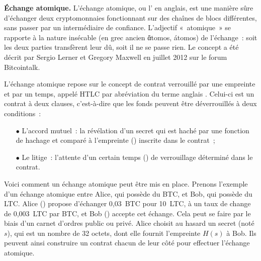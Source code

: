 
\textbf{Échange atomique.} L'échange atomique, ou l' en anglais, est une manière sûre d'échanger deux cryptomonnaies fonctionnant sur des chaînes de blocs différentes, sans passer par un intermédiaire de confiance. L'adjectif «~atomique~» se rapporte à la nature insécable (en grec ancien \foreignlanguage{greek}{ἄtomos}, átomos) de l'échange~: soit les deux parties transfèrent leur dû, soit il ne se passe rien. Le concept a été décrit par Sergio Lerner et Gregory Maxwell en juillet 2012 sur le forum Bitcointalk.

L'échange atomique repose sur le concept de contrat verrouillé par une empreinte et par un temps, appelé HTLC par abréviation du terme anglais . Celui-ci est un contrat à deux clauses, c'est-à-dire que les fonds peuvent être déverrouillés à deux conditions~:

\begin{itemize}
\item[$\bullet$] L'accord mutuel~: la révélation d'un secret qui est haché par une fonction de hachage et comparé à l'empreinte () inscrite dans le contrat~;
\item[$\bullet$] Le litige~: l'attente d'un certain temps () de verrouillage déterminé dans le contrat.
\end{itemize}

%

Voici comment un échange atomique peut être mis en place. Prenons l'exemple d'un échange atomique entre Alice, qui possède du BTC, et Bob, qui possède du LTC. Alice () propose d'échanger 0,03~BTC pour 10~LTC, à un taux de change de 0,003~LTC par BTC, et Bob () accepte cet échange. Cela peut se faire par le biais d'un carnet d'ordres public ou privé. Alice choisit au hasard un secret (noté $s$), qui est un nombre de 32 octets, dont elle fournit l'empreinte $H(s)$ à Bob. Ils peuvent ainsi construire un contrat chacun de leur côté pour effectuer l'échange atomique.

